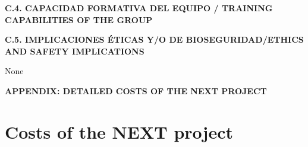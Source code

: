 \documentclass[a4paper,11pt,oneside]{article}
\begin{document}

%
%
%
%

\vspace{12pt}

\noindent\textbf{C.4. CAPACIDAD FORMATIVA DEL EQUIPO / TRAINING CAPABILITIES OF THE GROUP}


%
%
%
%


\vspace{12pt}

\noindent\textbf{C.5. IMPLICACIONES ÉTICAS Y/O DE BIOSEGURIDAD/ETHICS AND SAFETY IMPLICATIONS}

None

\noindent\textbf{APPENDIX: DETAILED COSTS OF THE NEXT PROJECT}

\section{\bf Costs of the NEXT project}
\label{next.costs}
\end{document}
